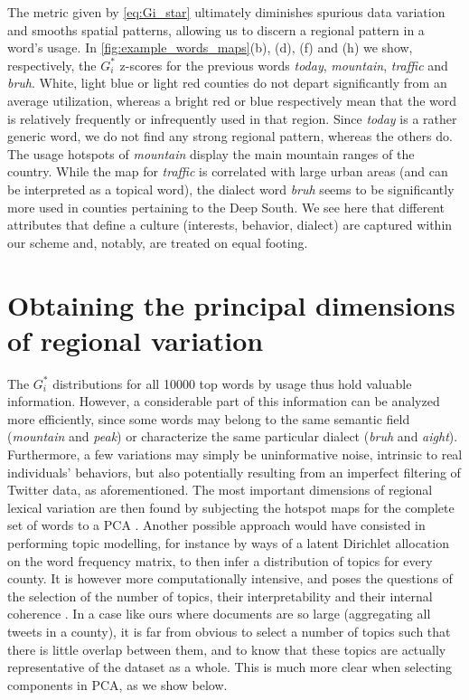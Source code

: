 \documentclass[../thesis.tex]{subfiles}
\begin{document}
The metric given by \cref{eq:Gi_star} ultimately diminishes spurious data variation and
smooths spatial patterns, allowing us to discern a regional pattern in a word's usage.
In \cref{fig:example_words_maps}(b), (d), (f) and (h) we show, respectively, the $G_i^*$
z-scores for the previous words \textit{today}, \textit{mountain}, \textit{traffic} and
\textit{bruh}. White, light blue or light red counties do not depart significantly from
an average utilization, whereas a bright red or blue respectively mean that the word is
relatively frequently or infrequently used in that region. Since \textit{today} is a
rather generic word, we do not find any strong regional pattern, whereas the others do.
The usage hotspots of \textit{mountain} display the main mountain ranges of the country.
While the map for \textit{traffic} is correlated with large urban areas (and can be
interpreted as a topical word), the dialect word \textit{bruh} seems to be significantly
more used in counties pertaining to the Deep South. We see here that different
attributes that define a culture (interests, behavior, dialect) are captured within our
scheme and, notably, are treated on equal footing.


\section{Obtaining the principal dimensions of regional variation}
The $G_i^*$ distributions for all \SI{10000}{} top words by usage thus hold valuable
information. However, a considerable part of this information can be analyzed more
efficiently, since some words may belong to the same semantic field (\textit{mountain}
and \textit{peak}) or characterize the same particular dialect (\textit{bruh} and
\textit{aight}). Furthermore, a few variations may simply be uninformative noise,
intrinsic to real individuals' behaviors, but also potentially resulting from an
imperfect filtering of Twitter data, as aforementioned. The most important dimensions of
regional lexical variation are then found by subjecting the hotspot maps for the
complete set of words to a \ac{PCA}
\cite{LieskeRegionalSubcultures1993,WoldPrincipalComponent1987}. Another possible
approach would have consisted in performing topic modelling, for instance by ways of a
latent Dirichlet allocation on the word frequency matrix, to then infer a distribution
of topics for every county. It is however more computationally intensive, and poses the
questions of the selection of the number of topics, their interpretability and their
internal coherence \cite{ArunFindingNatural2010,HasanNormalizedApproach2021}. In a case
like ours where documents are so large (aggregating all tweets in a county), it is far
from obvious to select a number of topics such that there is little overlap between
them, and to know that these topics are actually representative of the dataset as a
whole. This is much more clear when selecting components in \ac{PCA}, as we show
below.
\end{document}
